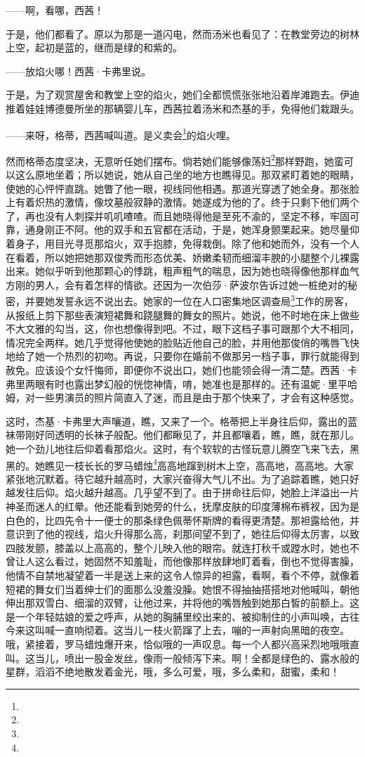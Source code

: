 \par ——啊，看哪，西茜！
\par 于是，他们都看了。原以为那是一道闪电，然而汤米也看见了：在教堂旁边的树林上空，起初是蓝的，继而是绿的和紫的。
\par ——放焰火哪！西茜·卡弗里说。
\par 于是，为了观赏屋舍和教堂上空的焰火，她们全都慌慌张张地沿着岸滩跑去。伊迪推着娃娃博德曼所坐的那辆婴儿车，西茜拉着汤米和杰基的手，免得他们栽跟头。
\par ——来呀，格蒂，西茜喊叫道。是义卖会\footnote{}的焰火哩。
\par 然而格蒂态度坚决，无意听任她们摆布。倘若她们能够像荡妇\footnote{}那样野跑，她蛮可以这么原地坐着；所以她说，她从自己坐的地方也瞧得见。那双紧盯着她的眼睛，使她的心怦怦直跳。她瞥了他一眼，视线同他相遇。那道光穿透了她全身。那张脸上有着炽热的激情，像坟墓般寂静的激情。她遂成为他的了。终于只剩下他们两个了，再也没有人刺探并叽叽喳喳。而且她晓得他是至死不渝的，坚定不移，牢固可靠，通身刚正不阿。他的双手和五官都在活动，于是，她浑身颤栗起来。她尽量仰着身子，用目光寻觅那焰火，双手抱膝，免得栽倒。除了他和她而外，没有一个人在看着，所以她把她那双俊秀而形态优美、娇嫩柔韧而细溜丰腴的小腿整个儿裸露出来。她似乎听到他那颗心的悸跳，粗声粗气的喘息，因为她也晓得像他那样血气方刚的男人，会有着怎样的情欲。还因为一次伯莎·萨波尔告诉过她一桩绝对的秘密，并要她发誓永远不说出去。她家的一位在人口密集地区调查局\footnote{}工作的房客，从报纸上剪下那些表演短裙舞和跷腿舞的舞女的照片。她说，他不时地在床上做些不大文雅的勾当，这，你也想像得到吧。不过，眼下这档子事可跟那个大不相同，情况完全两样。她几乎觉得他使她的脸贴近他自己的脸，并用他那俊俏的嘴唇飞快地给了她一个热烈的初吻。再说，只要你在婚前不做那另一档子事，罪行就能得到赦免。应该设个女忏悔师，即便你不说出口，她们也能领会得一清二楚。西茜·卡弗里两眼有时也露出梦幻般的恍惚神情，唷，她准也是那样的。还有温妮·里平哈姆，对一些男演员的照片简直入了迷，而且是由于那个快来了，才会有这种感觉。
\par 这时，杰基·卡弗里大声嚷道，瞧，又来了一个。格蒂把上半身往后仰，露出的蓝袜带刚好同透明的长袜子般配。他们都瞅见了，并且都嚷着，瞧，瞧，就在那儿。她一个劲儿地往后仰着看那焰火。这时，有个软软的古怪玩意儿腾空飞来飞去，黑黑的。她瞧见一枝长长的罗马蜡烛\footnote{}高高地蹿到树木上空，高高地，高高地。大家紧张地沉默着。待它越升越高时，大家兴奋得大气儿不出。为了追踪着瞧，她只好越发往后仰。焰火越升越高。几乎望不到了。由于拼命往后仰，她脸上洋溢出一片神圣而迷人的红晕。他还能看到她旁的什么，抚摩皮肤的印度薄棉布裤衩，因为是白色的，比四先令十一便士的那条绿色佩蒂怀斯牌的看得更清楚。那袒露给他，并意识到了他的视线，焰火升得那么高，刹那间望不到了，她往后仰得太厉害，以致四肢发颤，膝盖以上高高的，整个儿映入他的眼帘。就连打秋千或蹚水时，她也不曾让人这么看过，她固然不知羞耻，而他像那样放肆地盯着看，倒也不觉得害臊，他情不自禁地凝望着一半是送上来的这令人惊异的袒露，看啊，看个不停，就像着短裙的舞女们当着绅士们的面那么没羞没臊。她恨不得抽抽搭搭地对他喊叫，朝他伸出那双雪白、细溜的双臂，让他过来，并将他的嘴唇触到她那白皙的前额上。这是一个年轻姑娘的爱之呼声，从她的胸脯里绞出来的、被抑制住的小声叫唤，古往今来这叫喊一直响彻着。这当儿一枝火箭蹿了上去，嘣的一声射向黑暗的夜空。哦，紧接着，罗马蜡烛爆开来，恰似哦的一声叹息。每一个人都兴高采烈地哦哦直叫。这当儿，喷出一股金发丝，像雨一般倾泻下来。啊！全都是绿色的、露水般的星群，滔滔不绝地散发着金光，哦，多么可爱，哦，多么柔和，甜蜜，柔和！
